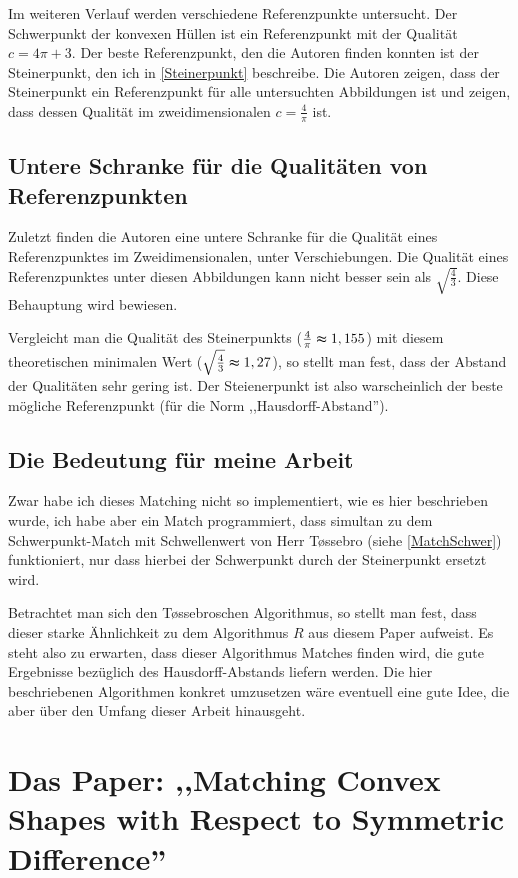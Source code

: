 Im weiteren Verlauf werden verschiedene Referenzpunkte untersucht. Der Schwerpunkt der konvexen Hüllen ist ein Referenzpunkt mit der Qualität $c=4\pi+3$. Der beste Referenzpunkt, den die Autoren finden konnten ist der Steinerpunkt, den ich in \ref{Steinerpunkt} beschreibe. Die Autoren zeigen, dass der Steinerpunkt ein Referenzpunkt für alle untersuchten Abbildungen ist und zeigen, dass dessen Qualität im zweidimensionalen $c=\frac{4}{\pi}$ ist. 

\subsection{Untere Schranke für die Qualitäten von Referenzpunkten}

Zuletzt finden die Autoren eine untere Schranke für die Qualität eines Referenzpunktes im Zweidimensionalen, unter Verschiebungen. Die Qualität eines Referenzpunktes unter diesen Abbildungen kann nicht besser sein als $\sqrt{\frac{4}{3}}$. Diese Behauptung wird bewiesen. 

Vergleicht man die Qualität des Steinerpunkts ($\frac{4}{\pi}\thickapprox 1,155$) mit diesem theoretischen minimalen Wert ($\sqrt{\frac{4}{3}}\thickapprox 1,27$), so stellt man fest, dass der Abstand der Qualitäten sehr gering ist. Der Steienerpunkt ist also warscheinlich der beste mögliche Referenzpunkt (für die Norm ,,Hausdorff-Abstand'').

\subsection{Die Bedeutung für meine Arbeit}\label{BedeutungAAR}

Zwar habe ich dieses Matching nicht so implementiert, wie es hier beschrieben wurde, ich habe aber ein Match programmiert, dass simultan zu dem Schwerpunkt-Match mit Schwellenwert von Herr T\o{}ssebro (siehe \ref{MatchSchwer}) funktioniert, nur dass hierbei der Schwerpunkt durch der Steinerpunkt ersetzt wird.

Betrachtet man sich den T\o{}ssebroschen Algorithmus, so stellt man fest, dass dieser starke Ähnlichkeit zu dem Algorithmus $R$ aus diesem Paper aufweist. Es steht also zu erwarten, dass dieser Algorithmus Matches finden wird, die gute Ergebnisse bezüglich des Hausdorff-Abstands liefern werden. Die hier beschriebenen Algorithmen konkret umzusetzen wäre eventuell eine gute Idee, die aber über den Umfang dieser Arbeit hinausgeht.

\section[Matching Shapes with Symmetric Difference]{Das Paper: ,,Matching Convex Shapes with Respect to Symmetric Difference'' }\label{AFRWW}

